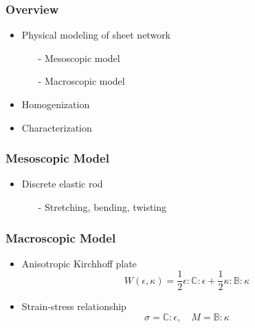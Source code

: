 \documentclass[serif,mathserif, 12pt]{beamer}
\begin{document}
\begin{frame}
  \frametitle{Overview}
  \begin{itemize}
  \item Physical modeling of sheet network
    \begin{itemize}
    \item[-] Mesoscopic model
    \item[-] Macroscopic model
    \end{itemize}
  \item Homogenization
  \item Characterization
  \end{itemize}
\end{frame}

\begin{frame}
  \frametitle{Mesoscopic Model}
  \begin{itemize}
  \item Discrete elastic rod
    \begin{itemize}
    \item[-] Stretching, bending, twisting
    \end{itemize}
  \end{itemize}
\end{frame}

\begin{frame}
  \frametitle{Macroscopic Model}
  \begin{itemize}
  \item Anisotropic Kirchhoff plate
    \[
      W(\epsilon, \kappa) = \frac{1}{2}\epsilon :\mathbb{C}:\epsilon+\frac{1}{2}\kappa:\mathbb{B}:\kappa
    \]
  \item Strain-stress relationship
    \[
    \sigma = \mathbb{C}:\epsilon,\quad M = \mathbb{B}:\kappa
    \]
  \end{itemize}
\end{frame}
\end{document}
